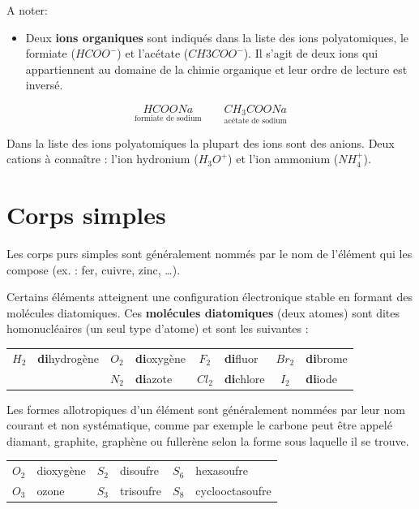 \documentclass[
  11pt,
  french,
  a4paper,
  openany]{book}
\providecommand{\tightlist}{%
  \setlength{\itemsep}{0pt}\setlength{\parskip}{0pt}}
\begin{document}
A noter:

\begin{itemize}
\tightlist
\item
  Deux \textbf{ions organiques} sont indiqués dans la liste des ions polyatomiques, le formiate (\(HCOO^-\)) et l'acétate (\(CH3COO^-\)). Il s'agit de deux ions qui appartiennent au domaine de la chimie organique et leur ordre de lecture est inversé.
\end{itemize}

\[ \underset{\text{formiate de sodium}}{HCOONa} \qquad \underset{\text{acétate de sodium}}{CH_3COONa} \]

Dans la liste des ions polyatomiques la plupart des ions sont des anions. Deux cations à connaître : l'ion hydronium (\(H_3O^+\)) et l'ion ammonium (\(NH_4^+\)).

\hypertarget{corps-simples}{%
\section{Corps simples}\label{corps-simples}}

Les corps purs simples sont généralement nommés par le nom de l'élément qui les compose (ex. : fer, cuivre, zinc, \ldots).

Certains éléments atteignent une configuration électronique stable en formant des molécules diatomiques. Ces \textbf{molécules diatomiques} (deux atomes) sont dites homonucléaires (un seul type d'atome) et sont les suivantes :

\begin{longtable}[]{@{}clclclcl@{}}
\toprule
\endhead
\(H_2\) & \textbf{di}hydrogène & \(O_2\) & \textbf{di}oxygène & \(F_2\) & \textbf{di}fluor & \(Br_2\) & \textbf{di}brome\tabularnewline
& & \(N_2\) & \textbf{di}azote & \(Cl_2\) & \textbf{di}chlore & \(I_2\) & \textbf{di}iode\tabularnewline
\bottomrule
\end{longtable}

Les formes allotropiques d'un élément sont généralement nommées par leur nom courant et non systématique, comme par exemple le carbone peut être appelé diamant, graphite, graphène ou fullerène selon la forme sous laquelle il se trouve.

\begin{longtable}[]{@{}clclcl@{}}
\toprule
\endhead
\(O_2\) & dioxygène & \(S_2\) & disoufre & \(S_6\) & hexasoufre\tabularnewline
\(O_3\) & ozone & \(S_3\) & trisoufre & \(S_8\) & cyclooctasoufre\tabularnewline
\bottomrule
\end{longtable}
\end{document}

